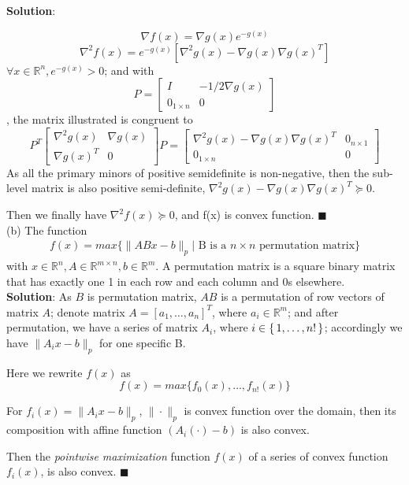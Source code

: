 \documentclass{article}
\begin{document}
\textbf{Solution}:

\[
	\nabla f(x) = \nabla g(x) e^{-g(x)}
\]
\[
	\nabla^2 f(x) = e^{-g(x)} [\nabla^2 g(x) - \nabla g(x) \nabla g(x)^T]
\]
$\forall x \in \mathbb{R}^n, e^{-g(x)} > 0$; and with
\[
	P = 
	\begin{bmatrix}
		I & -1/2\nabla g(x) \\
		0_{1 \times n} & 0
	\end{bmatrix}
\],
the matrix illustrated is congruent to
\[
	P^T
	\begin{bmatrix}
		\nabla^2 g(x) & \nabla g(x) \\
		\nabla g(x)^T & 0
	\end{bmatrix}
	P =
	\begin{bmatrix}
		\nabla^2 g(x) - \nabla g(x) \nabla g(x)^T & 0_{n \times 1} \\
		0_{1 \times n} & 0
	\end{bmatrix}
\]
As all the primary minors of positive semidefinite is non-negative, then the sub-level matrix is also positive semi-definite, $\nabla^2 g(x) - \nabla g(x) \nabla g(x)^T \succeq 0$.

Then we finally have $\nabla^2 f(x) \succeq 0$, and f(x) is convex function. $\blacksquare$ \\

(b) The function
\begin{align}
	f(x) = max\{ \|ABx-b\|_p | \text{ B is a $n \times n$ permutation matrix}\} \nonumber
\end{align}
with $x \in \mathbb{R}^n, A \in \mathbb{R}^{m \times n}, b \in \mathbb{R}^m$. A permutation matrix is a square binary matrix that has exactly one 1 in each row and each column and 0s elsewhere. \\

\textbf{Solution}:
As $B$ is permutation matrix, $AB$ is a permutation of row vectors of matrix $A$; denote matrix $A=[a_1, \dots, a_n]^T$, where $a_i \in \mathbb{R}^m$; and after permutation, we have a series of matrix $A_i$, where $i\in \set{1, \dots, n!}$; accordingly we have $\|A_{i}x-b\|_p$ for one specific B. 

Here we rewrite $f(x)$ as
\[
	f(x) = max\{f_0(x), \dots, f_{n!}(x)\}
\]

For $f_i(x) = \|A_{i}x-b\|_p$, $ \| \cdot \|_p $ is convex function over the domain, then its composition with affine function $(A_i(\cdot)-b)$ is also convex.

Then the \textit{pointwise maximization} function $f(x)$ of a series of convex function $f_i(x)$, is also convex. $\blacksquare$ \\
\end{document}
